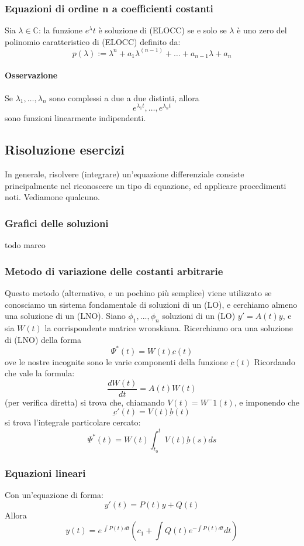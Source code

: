 \documentclass[a4paper,12pt]{article}
\begin{document}
\subsubsection{Equazioni di ordine n a coefficienti costanti}
Sia $\lambda \in \mathbb{C}$: la funzione $e^\lambda t$ è soluzione di (ELOCC) se e solo se $\lambda$ è uno zero del polinomio caratteristico di (ELOCC) definito da: $$ p(\lambda) := \lambda^n + a_1\lambda^{(n-1)}+ \dots +a_{n-1}\lambda+a_n$$
\paragraph*{Osservazione}
Se  $\lambda_1,\dots,\lambda_n$ sono complessi a due a due distinti, allora 
$$ e^{\lambda_1 t}, \dots ,e^{\lambda_n t}$$ sono funzioni linearmente indipendenti. 



\subsection{Risoluzione esercizi}
In generale, risolvere (integrare) un'equazione differenziale consiste principalmente nel riconoscere un tipo di equazione, ed applicare procedimenti noti. Vediamone qualcuno.

\subsubsection{Grafici delle soluzioni}
todo marco

\subsubsection{Metodo di variazione delle costanti arbitrarie}
Questo metodo (alternativo, e un pochino più semplice) viene utilizzato se conosciamo un sistema fondamentale di soluzioni di un (LO), e cerchiamo almeno una soluzione di un (LNO).
Siano $\phi_1,...,\phi_n$ soluzioni di un (LO) $y'= A(t)y$, e sia $W(t)$ la corrispondente matrice wronskiana.
Ricerchiamo ora una soluzione di (LNO) della forma
$$\Psi^*(t)=W(t)\underbar{c}(t)$$
ove le nostre incognite sono le varie componenti della funzione $\underbar{c}(t)$
Ricordando che vale la formula:
$$\frac{dW(t)}{dt} = A(t)W(t)$$
(per verifica diretta) si trova che, chiamando $V(t) = W^-1(t)$, e imponendo che $$\underbar{c}'(t) = V(t)\underbar{b}(t)$$
si trova l'integrale particolare cercato:
$$\Psi^*(t)= W(t)\int_{t_0}^t V(t)\underbar{b}(s) ds$$

\subsubsection{Equazioni lineari}
Con un'equazione di forma:
$$y'(t) = P(t)y+Q(t)$$
Allora
$$y(t)=e^{\ \displaystyle\int P(t)dt}\left(c_1 + \int Q(t)e^{-\displaystyle\int P(t)dt}dt\right)$$
\end{document}
